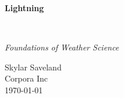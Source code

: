 \clearpage
\vspace*{1.5in}
\begin{center}
  \begin{minipage}{\textwidth}
    \centering
    \Huge\bfseries
    \linespread{1.25}\selectfont
  Lightning
  \end{minipage}
  \\[3em]
  {\Large\itshape\linespread{1.3}\selectfont
  Foundations of Weather Science\par}
  \vfill
  {\large Skylar Saveland}
  \\[1em]
  {\large Corpora Inc}
  \\[1em]
  {\large \today}
\end{center}
\clearpage
